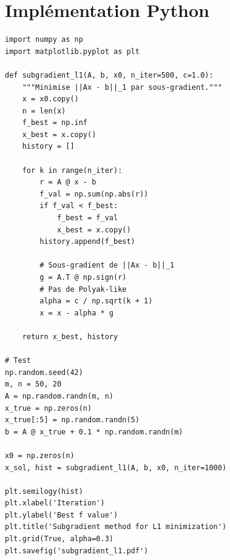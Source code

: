 \begin{center}
\end{center}

\section{Impl\'ementation Python}

\begin{codeblock}[title=\textbf{M\'ethode du sous-gradient pour la norme $\ell_1$}]
\begin{verbatim}
import numpy as np
import matplotlib.pyplot as plt

def subgradient_l1(A, b, x0, n_iter=500, c=1.0):
    """Minimise ||Ax - b||_1 par sous-gradient."""
    x = x0.copy()
    n = len(x)
    f_best = np.inf
    x_best = x.copy()
    history = []

    for k in range(n_iter):
        r = A @ x - b
        f_val = np.sum(np.abs(r))
        if f_val < f_best:
            f_best = f_val
            x_best = x.copy()
        history.append(f_best)

        # Sous-gradient de ||Ax - b||_1
        g = A.T @ np.sign(r)
        # Pas de Polyak-like
        alpha = c / np.sqrt(k + 1)
        x = x - alpha * g

    return x_best, history

# Test
np.random.seed(42)
m, n = 50, 20
A = np.random.randn(m, n)
x_true = np.zeros(n)
x_true[:5] = np.random.randn(5)
b = A @ x_true + 0.1 * np.random.randn(m)

x0 = np.zeros(n)
x_sol, hist = subgradient_l1(A, b, x0, n_iter=1000)

plt.semilogy(hist)
plt.xlabel('Iteration')
plt.ylabel('Best f value')
plt.title('Subgradient method for L1 minimization')
plt.grid(True, alpha=0.3)
plt.savefig('subgradient_l1.pdf')
\end{verbatim}
\end{codeblock}

